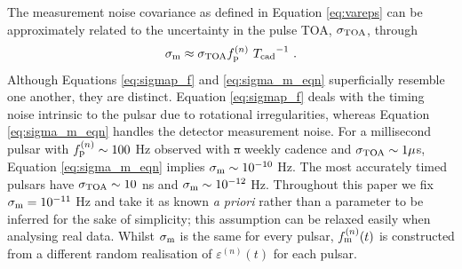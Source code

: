 \documentclass[fleqn,usenatbib,useAMS]{mnras}
\providecommand{\DIFadd}[1]{{\protect\color{blue}\uwave{#1}}} %
\providecommand{\DIFdel}[1]{{\protect\color{red}\sout{#1}}}                      %
\providecommand{\DIFaddbegin}{} %
\providecommand{\DIFaddend}{} %
\providecommand{\DIFdelbegin}{} %
\providecommand{\DIFdelend}{} %
\newcommand{\DIFscaledelfig}{0.5}
\newlength{\DIFdelgraphicswidth} %
\newlength{\DIFdelgraphicsheight} %
\newcommand{\DIFaddincludegraphics}[2][]{{\color{blue}\fbox{\DIFOincludegraphics[#1]{#2}}}} %
\newcommand{\DIFdelincludegraphics}[2][]{%
\sbox{\DIFdelgraphicsbox}{\DIFOincludegraphics[#1]{#2}}%
\settoboxwidth{\DIFdelgraphicswidth}{\DIFdelgraphicsbox} %
\settoboxtotalheight{\DIFdelgraphicsheight}{\DIFdelgraphicsbox} %
\scalebox{\DIFscaledelfig}{%
\parbox[b]{\DIFdelgraphicswidth}{\usebox{\DIFdelgraphicsbox}\\[-\baselineskip] \rule{\DIFdelgraphicswidth}{0em}}\llap{\resizebox{\DIFdelgraphicswidth}{\DIFdelgraphicsheight}{%
\setlength{\unitlength}{\DIFdelgraphicswidth}%
\begin{picture}(1,1)%
\thicklines\linethickness{2pt} %
{\color[rgb]{1,0,0}\put(0,0){\framebox(1,1){}}}%
{\color[rgb]{1,0,0}\put(0,0){\line( 1,1){1}}}%
{\color[rgb]{1,0,0}\put(0,1){\line(1,-1){1}}}%
\end{picture}%
}\hspace*{3pt}}} %
} %
\DeclareRobustCommand{\DIFaddbegin}{\DIFOaddbegin \let\includegraphics\DIFaddincludegraphics} %
\DeclareRobustCommand{\DIFaddend}{\DIFOaddend \let\includegraphics\DIFOincludegraphics} %
\DeclareRobustCommand{\DIFdelbegin}{\DIFOdelbegin \let\includegraphics\DIFdelincludegraphics} %
\DeclareRobustCommand{\DIFdelend}{\DIFOaddend \let\includegraphics\DIFOincludegraphics} %
\begin{document}
The measurement noise covariance as defined in Equation \eqref{eq:vareps} can be approximately related to the uncertainty in the pulse TOA, $\sigma_{\rm TOA}$, through
\begin{equation}
	\sigma_{\rm m} \approx \sigma_{\rm TOA} f_{\rm p}^{(n)}  \ {T_{\rm cad}}^{-1} \ . \label{eq:sigma_m_eqn}
\end{equation}
Although Equations \eqref{eq:sigmap_f} and \eqref{eq:sigma_m_eqn} superficially resemble one another, they are distinct. Equation \eqref{eq:sigmap_f} deals with the timing noise intrinsic to the pulsar due to rotational irregularities, whereas Equation \eqref{eq:sigma_m_eqn} handles the detector measurement noise. For a millisecond pulsar with \DIFdelbegin \DIFdel{$f_{\rm p}^{(n)} \sim 100$ }\DIFdelend \DIFaddbegin \DIFadd{$f_{\rm p}^{(n)} \sim 10^2$ }\DIFaddend Hz observed with \DIFdelbegin \DIFdel{a }\DIFdelend weekly cadence and $\sigma_{\rm TOA} \sim 1 \mu$s, Equation \eqref{eq:sigma_m_eqn} implies $\sigma_{\rm m} \sim 10^{-10}$ Hz. The most accurately timed pulsars have $\sigma_{\rm TOA} \sim 10 $ ns and $\sigma_{\rm m} \sim 10^{-12}$ Hz. Throughout this paper we fix $\sigma_{\rm m} = 10^{-11}$ Hz and take it as known \textit{a priori} rather than a parameter to be inferred for the sake of simplicity; this assumption can be relaxed easily when analysing real data. Whilst $\sigma_{\rm m}$ is the same for every pulsar, $f_{\rm m} ^{(n)}(t)$ is constructed from a different random realisation of $\varepsilon^{(n)}(t)$ for each pulsar. \newline 
\end{document}
